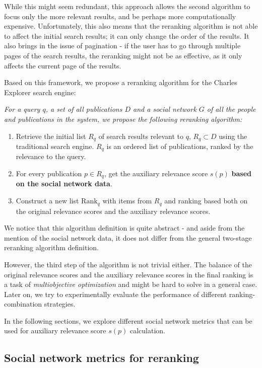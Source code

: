 While this might seem redundant, this approach allows the second algorithm to focus only the more relevant results, 
and be perhaps more computationally expensive.
Unfortunately, this also means that the reranking algorithm is not able to affect the initial search results; 
it can only change the order of the results. It also brings in the issue of pagination - if the user has to go 
through multiple pages of the search results, the reranking might not be as effective, as it only affects the current page of the results.

Based on this framework, we propose a reranking algorithm for the Charles Explorer search engine:

\textit{For a query $q$, a set of all publications $D$ and a social network $G$ of all the people and publications in the system, 
we propose the following reranking algorithm:}

\begin{enumerate}
    \item Retrieve the initial list $R_q$ of search results relevant to $q$, $R_q \subset D$ using the traditional search engine.
    $R_q$ is an ordered list of publications, ranked by the relevance to the query.
    \item For every publication $p \in R_q$, get the auxiliary relevance score $s(p)$ \textbf{based on the social network data}.
    \item Construct a new list $\text{Rank}_q$ with items from $R_q$ and ranking based both on the original relevance scores and the auxiliary relevance scores.
\end{enumerate}

We notice that this algorithm definition is quite abstract - and aside from the mention of the social network data, 
it does not differ from the general two-stage reranking algorithm definition.

However, the third step of the algorithm is not trivial either. The balance of the original relevance scores and the auxiliary relevance scores
in the final ranking is a task of \textit{multiobjective optimization} and might be hard to solve in a general case.
Later on, we try to experimentally evaluate the performance of different ranking-combination strategies.

In the following sections, we explore different social network metrics that can be used for auxiliary relevance score $s(p)$ calculation.

\subsection{Social network metrics for reranking}

